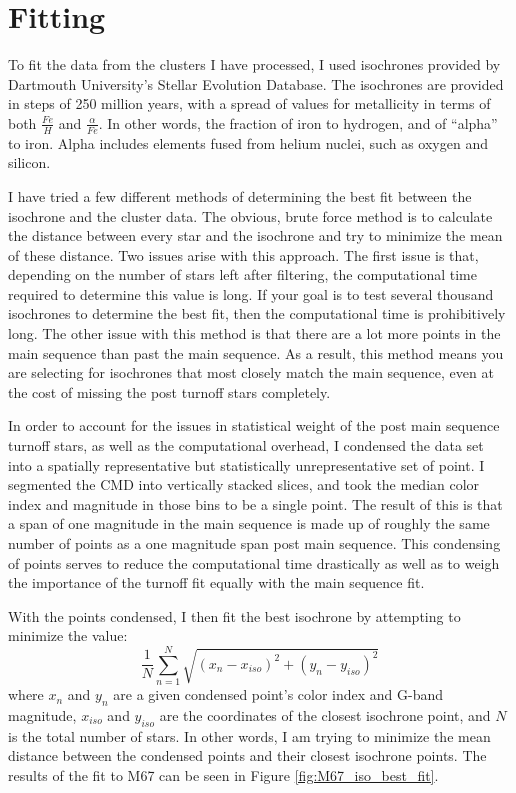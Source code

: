 \documentclass[aps,prb,twocolumn,groupedaddress,nofootinbib,floatfix]{revtex4-1}
\newcommand{\beq}{\begin{equation}}
\newcommand{\eeq}{\end{equation}}
\begin{document}
\section*{Fitting}
To fit the data from the clusters I have processed, I used isochrones provided by Dartmouth University's Stellar Evolution Database. The isochrones are provided in steps of 250 million years, with a spread of values for metallicity in terms of both $\frac{Fe}{H}$ and $\frac{\alpha}{Fe}$. In other words, the fraction of iron to hydrogen, and of ``alpha'' to iron. Alpha includes elements fused from helium nuclei, such as oxygen and silicon.

I have tried a few different methods of determining the best fit between the isochrone and the cluster data. The obvious, brute force method is to calculate the distance between every star and the isochrone and try to minimize the mean of these distance. Two issues arise with this approach. The first issue is that, depending on the number of stars left after filtering, the computational time required to determine this value is long. If your goal is to test several thousand isochrones to determine the best fit, then the computational time is prohibitively long. The other issue with this method is that there are a lot more points in the main sequence than past the main sequence. As a result, this method means you are selecting for isochrones that most closely match the main sequence, even at the cost of missing the post turnoff stars completely.

In order to account for the issues in statistical weight of the post main sequence turnoff stars, as well as the computational overhead, I condensed the data set into a spatially representative but statistically unrepresentative set of point. I segmented the CMD into vertically stacked slices, and took the median color index and magnitude in those bins to be a single point. The result of this is that a span of one magnitude in the main sequence is made up of roughly the same number of points as a one magnitude span post main sequence. This condensing of points serves to reduce the computational time drastically as well as to weigh the importance of the turnoff fit equally with the main sequence fit.

With the points condensed, I then fit the best isochrone by attempting to minimize the value:
\beq
\frac{1}{N}\sum\limits_{n=1}^{N}\sqrt{\left(x_n-x_{iso}\right)^2+\left(y_n-y_{iso}\right)^2}
\eeq
where $x_n$ and $y_n$ are a given condensed point's color index and G-band magnitude, $x_{iso}$ and $y_{iso}$ are the coordinates of the closest isochrone point, and $N$ is the total number of stars. In other words, I am trying to minimize the mean distance between the condensed points and their closest isochrone points. The results of the fit to M67 can be seen in Figure \ref{fig:M67_iso_best_fit}.
\end{document}
